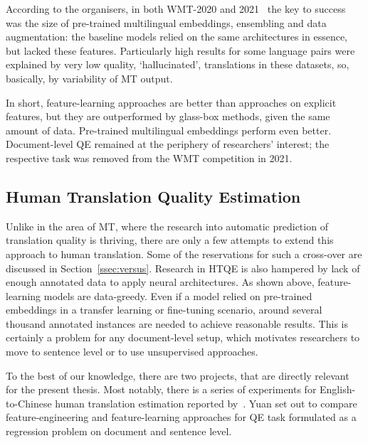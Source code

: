 According to the organisers, in both WMT-2020 and 2021~\cite{Specia2020wmt, Specia2021wmt} the key to success was the size of pre-trained multilingual embeddings, ensembling and data augmentation: the baseline models relied on the same architectures in essence, but lacked these features. Particularly high results for some language pairs were explained by very low quality, `hallucinated', translations in these datasets, so, basically, by variability of MT output.   


In short, feature-learning approaches are better than approaches on explicit features, but they are outperformed by glass-box methods, given the same amount of data. Pre-trained multilingual embeddings perform even better. Document-level QE remained at the periphery of researchers' interest; the respective task was removed from the WMT competition in 2021.

\subsection{\label{ssec:htqe}Human Translation Quality Estimation}

Unlike in the area of MT, where the research into automatic prediction of translation quality is thriving, there are only a few attempts to extend this approach to human translation. Some of the reservations for such a cross-over are discussed in Section~\ref{ssec:versus}. Research in HTQE is also hampered by lack of enough annotated data to apply neural architectures. As shown above, feature-learning models are data-greedy. Even if a model relied on pre-trained embeddings in a transfer learning or fine-tuning scenario, around several thousand annotated instances are needed to achieve reasonable results. This is certainly a problem for any document-level setup, which motivates researchers to move to sentence level or to use unsupervised approaches.
 
To the best of our knowledge, there are two projects, that are directly relevant for the present thesis. 
\label{pg:yuan_previous}
Most notably, there is a series of experiments for English-to-Chinese human translation estimation reported by~\citet{Yuan2016, Yuan2018, Yuan2020}.
Yuan set out to compare feature-engineering and feature-learning approaches for QE task formulated as a regression problem on document and sentence level.

